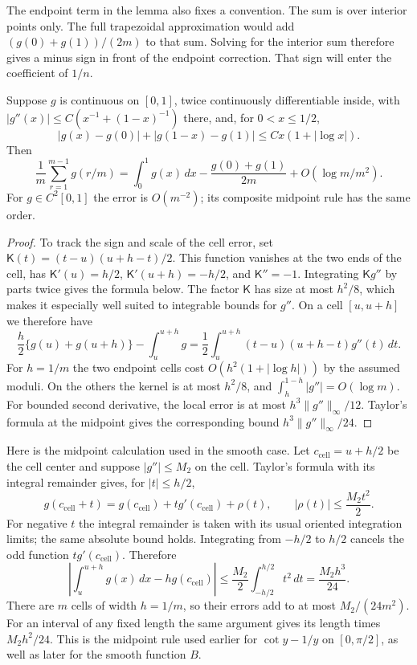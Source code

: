The endpoint term in the lemma also fixes a convention. The sum is
over interior points only. The full trapezoidal approximation would
add $(g(0)+g(1))/(2m)$ to that sum. Solving for the interior sum
therefore gives a minus sign in front of the endpoint correction.
That sign will enter the coefficient of $1/n$.

\begin{lemma}\label{cu:quadrature}
Suppose $g$ is continuous on $[0,1]$, twice continuously differentiable
inside, with $|g''(x)|\leq C(x^{-1}+(1-x)^{-1})$ there, and, for
$0<x\leq1/2$,
\[
 |g(x)-g(0)|+|g(1-x)-g(1)|\leq Cx(1+|\log x|).
\]
Then
\[
 \frac1m\sum_{r=1}^{m-1}g(r/m)=\int_0^1g(x)\,dx
       -\frac{g(0)+g(1)}{2m}+O(\log m/m^2).
\]
For $g\in C^2[0,1]$ the error is $O(m^{-2})$; its composite midpoint
rule has the same order.
\end{lemma}
\begin{proof}
To track the sign and scale of the cell error, set
$\mathsf K(t)=(t-u)(u+h-t)/2$. This function vanishes at the two ends of
the cell, has $\mathsf K'(u)=h/2$, $\mathsf K'(u+h)=-h/2$, and $\mathsf K''=-1$.
Integrating $\mathsf K g''$ by parts twice gives the formula below.
The factor $\mathsf K$ has size at most $h^2/8$, which makes it especially
well suited to integrable bounds for $g''$. On a cell $[u,u+h]$
we therefore have
\[
 \frac h2\{g(u)+g(u+h)\}-\int_u^{u+h}g
 =\frac12\int_u^{u+h}(t-u)(u+h-t)g''(t)\,dt.
\]
For $h=1/m$ the two endpoint cells cost $O(h^2(1+|\log h|))$ by
the assumed moduli. On the others the kernel is at most $h^2/8$,
and $\int_h^{1-h}|g''|=O(\log m)$. For bounded second derivative,
the local error is at most $h^3\|g''\|_\infty/12$. Taylor's formula
at the midpoint gives the corresponding bound $h^3\|g''\|_\infty/24$.
\end{proof}

Here is the midpoint calculation used in the smooth case.
Let $c_{\mathrm{cell}}=u+h/2$ be the cell center and suppose $|g''|\leq M_2$
on the cell. Taylor's formula with its integral remainder gives,
for $|t|\leq h/2$,
\[
 g(c_{\mathrm{cell}}+t)=g(c_{\mathrm{cell}})+t g'(c_{\mathrm{cell}})+\rho(t),\qquad
 |\rho(t)|\leq\frac{M_2t^2}{2}.
\]
For negative $t$ the integral remainder is taken with its usual
oriented integration limits; the same absolute bound holds.
Integrating from $-h/2$ to $h/2$ cancels the odd function
$t g'(c_{\mathrm{cell}})$. Therefore
\[
 \left|\int_u^{u+h}g(x)\,dx-hg(c_{\mathrm{cell}})\right|
 \leq\frac{M_2}{2}\int_{-h/2}^{h/2}t^2\,dt
 =\frac{M_2h^3}{24}.
\]
There are $m$ cells of width $h=1/m$, so their errors add to at
most $M_2/(24m^2)$. For an interval of any fixed length the
same argument gives its length times $M_2h^2/24$.
This is the midpoint rule used earlier for $\cot y-1/y$
on $[0,\pi/2]$, as well as later for the smooth function $B$.

